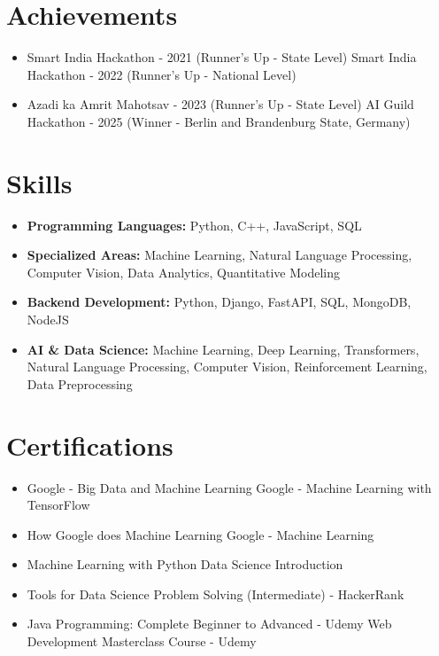 \documentclass[a4paper,10pt]{article}
\begin{document}
\section*{Achievements}
\begin{itemize}
\item Smart India Hackathon - 2021 (Runner's Up - State Level) \hfill Smart India Hackathon - 2022 (Runner's Up - National Level)
\item Azadi ka Amrit Mahotsav - 2023 (Runner's Up - State Level) \hfill AI Guild Hackathon - 2025 (Winner - Berlin and Brandenburg State, Germany)
\end{itemize}

\section*{Skills}
\begin{itemize}
  \item \textbf{Programming Languages:} Python, C++, JavaScript, SQL
  \item \textbf{Specialized Areas:} Machine Learning, Natural Language Processing, Computer Vision, Data Analytics, Quantitative Modeling
  \item \textbf{Backend Development:} Python, Django, FastAPI, SQL, MongoDB, NodeJS
  \item \textbf{AI \& Data Science:} Machine Learning, Deep Learning, Transformers, Natural Language Processing, Computer Vision, Reinforcement Learning, Data Preprocessing
\end{itemize}

\section*{Certifications}
\begin{itemize}
\item Google - Big Data and Machine Learning \hfill Google - Machine Learning with TensorFlow
\item How Google does Machine Learning \hfill Google - Machine Learning
\item Machine Learning with Python \hfill Data Science Introduction
\item Tools for Data Science \hfill Problem Solving (Intermediate) - HackerRank
\item Java Programming: Complete Beginner to Advanced - Udemy \hfill Web Development Masterclass Course - Udemy
\end{itemize}
\end{document}
